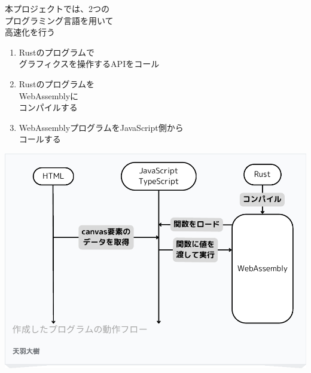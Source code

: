 \newpage

\begin{minipage}[t]{0.4\textwidth}\vspace{0pt}
本プロジェクトでは、2つの\\プログラミング言語を用いて\\高速化を行う

\begin{enumerate}[parsep=-0.5\zh]
	\item Rustのプログラムで\\グラフィクスを操作するAPIをコール
	\item Rustのプログラムを\\WebAssemblyに\\コンパイルする
	\item WebAssemblyプログラムをJavaScript側から\\コールする
\end{enumerate}
\end{minipage}
\begin{minipage}[t]{0.6\textwidth}\vspace{0pt}
\begin{center}
\includegraphics[keepaspectratio, width=.9\linewidth,trim={0mm 0mm 0mm 0mm},clip]{fig/system.pdf}
\end{center}
\end{minipage}

